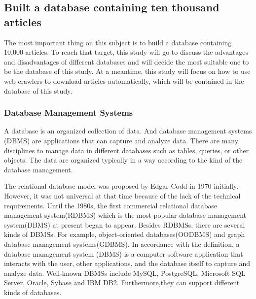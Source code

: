 
\subsection{Built a database containing ten thousand articles}

The most important thing on this subject is to build a database containing 10,000 articles.
To reach that target, this study will go to discuss the advantages and disadvantages of different databases and will decide the most suitable one to be the database of this study.
At a meantime, this study will focus on how to use web crawlers to download articles automatically, which will be contained in the database of this study.

\subsubsection{Database Management Systems}

A database is an organized collection of data.
And database management systems (DBMS) are applications that can capture and analyze data.
There are many disciplines to manage data in different databases such as tables, queries, or other objects. 
The data are organized typically in a way according to the kind of the database management. 

The relational database model was proposed by Edgar Codd in 1970 initially.
However, it was not universal at that time because of the lack of the technical requirements.
Until the 1980s, the first commercial relational database management system(RDBMS) which is the most popular database management system(DBMS) at present began to appear.
Besides RDBMSs, there are several kinds of DBMSs.
For example, object-oriented databases(OODBMS) and graph database management systems(GDBMS).
In accordance with the definition, a database management system (DBMS) is a computer software application that interacts with the user, other applications, and the database itself to capture and analyze data.
Well-known DBMSs include MySQL, PostgreSQL, Microsoft SQL Server, Oracle, Sybase and IBM DB2.
Furthermore,they can support different kinds of databases.

